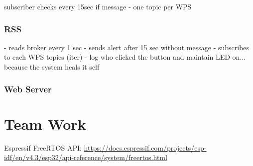 \documentclass[11pt]{article}
\begin{document}
subscriber checks every 15sec if message
- one topic per WPS

\subsubsection{RSS}

- reads broker every 1 sec
- sends alert after 15 sec without message
- subscribes to each WPS topics (iter)
- log who clicked the button and maintain LED on... because the system heals it self 

\subsubsection{Web Server}

\section{Team Work}


\newpage
\begin{thebibliography}{8}

 Espressif FreeRTOS API: {\url{https://docs.espressif.com/projects/esp-idf/en/v4.3/esp32/api-reference/system/freertos.html}}

\end{thebibliography}
\end{document}
